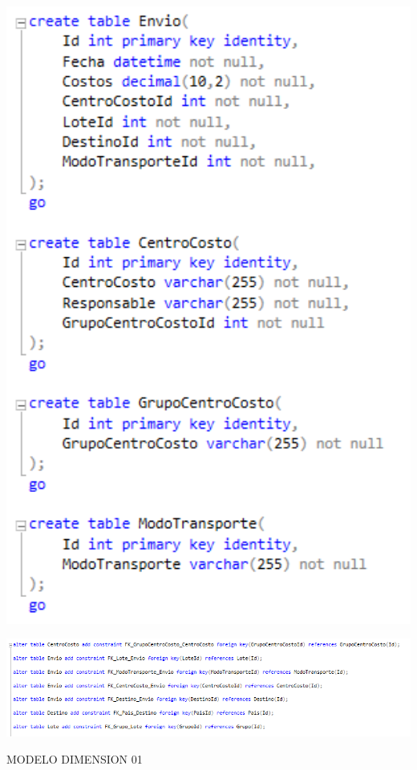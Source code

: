 	\begin{center}
	\includegraphics[width=17cm]{./Imagenes/12}
	\end{center}

	\begin{center}
	\includegraphics[width=17cm]{./Imagenes/13}
	\end{center}

MODELO DIMENSION 01

